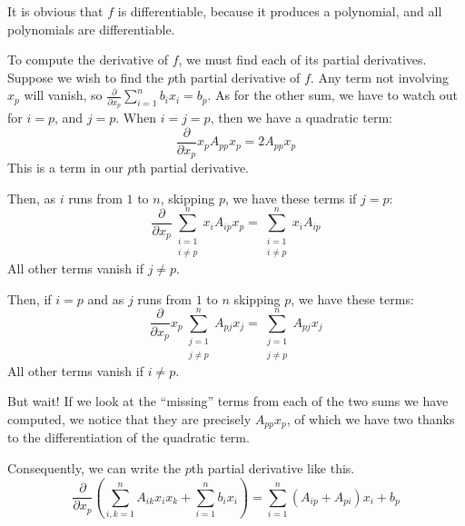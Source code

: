 \documentclass[letterpaper,11pt]{article}
\newcommand{\del}[1]{\frac{\partial}{\partial#1}}
\begin{document}
\begin{enumerate}
\begin{enumerate}
                It is obvious that $f$ is differentiable, because it produces a
                polynomial, and all polynomials are differentiable.

                To compute the derivative of $f$, we must find each of its
                partial derivatives. Suppose we wish to find the $p$th partial
                derivative of $f$. Any term not involving $x_p$ will vanish, so
                $\del{x_p} {\sum_{i=1}^n {b_i x_i}} = b_p$. As for the other
                sum, we have to watch out for $i = p$, and $j = p$. When
                $i = j = p$, then we have a quadratic term:
                \begin{equation*}
                    \del{x_p} {x_p A_{pp} x_p} = 2 A_{pp} x_p
                \end{equation*}
                This is a term in our $p$th partial derivative.

                Then, as $i$ runs from $1$ to $n$, skipping $p$, we have these
                terms if $j = p$:
                \begin{equation*}
                    \del{x_p} {
                        \sum_{\substack{i=1\\i\neq p}}^n x_i A_{ip} x_p
                    }
                    =
                    \sum_{\substack{i=1\\i\neq p}}^n { x_i A_{ip} }
                \end{equation*}
                All other terms vanish if $j \neq p$.

                Then, if $i = p$ and as $j$ runs from $1$ to $n$ skipping $p$,
                we have these terms:
                \begin{equation*}
                    \del{x_p} {
                        x_p \sum_{\substack{j=1\\j\neq p}}^n { A_{pj} x_j }
                    }
                    =
                    \sum_{\substack{j=1\\j\neq p}}^n { A_{pj} x_j }
                \end{equation*}
                All other terms vanish if $i \neq p$.

                But wait! If we look at the ``missing'' terms from each of the
                two sums we have computed, we notice that they are precisely
                $A_{pp} x_p$, of which we have two thanks to the
                differentiation of the quadratic term.

                Consequently, we can write the $p$th partial derivative like
                this.
                \begin{equation*}
                    \del{x_p} {\left(
                        \sum_{i,k=1}^n A_{ik}x_ix_k + \sum_{i=1}^n b_i x_i
                    \right)}
                    =
                    \sum_{i=1}^n { (A_{ip} + A_{pi}) x_i }
                    +
                    b_p
                \end{equation*}


\end{enumerate}
\end{enumerate}
\end{document}
